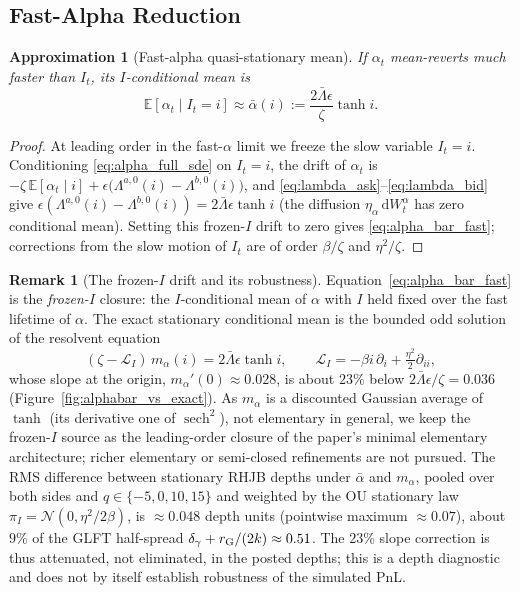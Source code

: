 \documentclass[11pt,a4paper]{article}
\newcommand{\E}{\mathbb{E}}
\newcommand{\Lcal}{\mathcal{L}}
\newcommand{\dd}{\,\mathrm{d}}
\newcommand{\alphabar}{\bar\alpha}
\theoremstyle{plain}
\newtheorem{approximation}[proposition]{Approximation}
\theoremstyle{definition}
\newtheorem{remark}{Remark}[section]
\begin{document}
\subsection{Fast-Alpha Reduction}

\begin{approximation}[Fast-alpha quasi-stationary mean]
\label{prop:alpha_bar}
If \(\alpha_t\) mean-reverts much faster than \(I_t\), its \(I\)-conditional mean is
\begin{equation}
\E[\alpha_t \mid I_t=i] \approx \alphabar(i) := \frac{2\bar\Lambda\epsilon}{\zeta}\tanh i .
\label{eq:alpha_bar_fast}
\end{equation}
\end{approximation}

\begin{proof}
At leading order in the fast-\(\alpha\) limit we freeze the slow variable
\(I_t=i\).  Conditioning \eqref{eq:alpha_full_sde} on \(I_t=i\), the drift of \(\alpha_t\)
is \(-\zeta\,\E[\alpha_t\mid i]+\epsilon\bigl(\Lambda^{a,0}(i)-\Lambda^{b,0}(i)\bigr)\),
and \eqref{eq:lambda_ask}--\eqref{eq:lambda_bid} give
\(\epsilon(\Lambda^{a,0}(i)-\Lambda^{b,0}(i))=2\bar\Lambda\epsilon\tanh i\) (the
diffusion \(\eta_\alpha\dd W^\alpha_t\) has zero conditional mean).  Setting this
frozen-\(I\) drift to zero gives \eqref{eq:alpha_bar_fast}; corrections from the
slow motion of \(I_t\) are of order \(\beta/\zeta\) and \(\eta^2/\zeta\).
\end{proof}

\begin{remark}[The frozen-\(I\) drift and its robustness]
\label{rem:frozen_i_robustness}
Equation~\eqref{eq:alpha_bar_fast} is the \emph{frozen-\(I\)} closure: the
\(I\)-conditional mean of \(\alpha\) with \(I\) held fixed over the fast
lifetime of \(\alpha\).  The exact stationary conditional mean is the bounded
odd solution of the resolvent equation
\[
(\zeta-\Lcal_I)\,m_\alpha(i)=2\bar\Lambda\epsilon\tanh i,\qquad
\Lcal_I=-\beta i\,\partial_i+\tfrac{\eta^2}{2}\partial_{ii},
\]
whose slope at the origin, \(m_\alpha'(0)\approx0.028\), is about \(23\%\)
below \(2\bar\Lambda\epsilon/\zeta=0.036\) (Figure~\ref{fig:alphabar_vs_exact}).  As \(m_\alpha\) is a discounted
Gaussian average of \(\tanh\) (its derivative one of \(\operatorname{sech}^2\)),
not elementary in general, we keep the frozen-\(I\) source as the leading-order
closure of the paper's minimal elementary architecture; richer elementary or
semi-closed refinements are not pursued.  The RMS difference between stationary
RHJB depths under \(\alphabar\) and \(m_\alpha\), pooled over both sides and
\(q\in\{-5,0,10,15\}\) and weighted by the OU stationary law
\(\pi_I=\mathcal N(0,\eta^2/2\beta)\), is \(\approx0.048\) depth units
(pointwise maximum \(\approx0.07\)), about \(9\%\) of the GLFT half-spread
\(\delta_\gamma+r_{\rm G}/(2k)\approx0.51\).  The \(23\%\) slope correction is
thus attenuated, not eliminated, in the posted depths; this is a depth
diagnostic and does not by itself establish robustness of the simulated PnL\@.
\end{remark}
\end{document}
